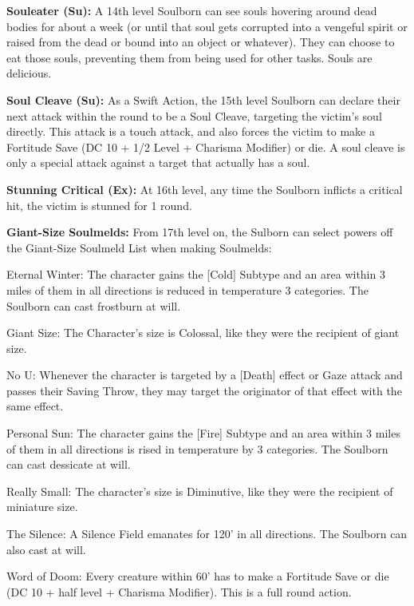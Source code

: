 \textbf{Souleater (Su):} A 14th level Soulborn can see souls hovering around dead bodies for about a week (or until that soul gets corrupted into a vengeful spirit or raised from the dead or bound into an object or whatever). They can choose to eat those souls, preventing them from being used for other tasks. Souls are delicious.

\textbf{Soul Cleave (Su):} As a Swift Action, the 15th level Soulborn can declare their next attack within the round to be a Soul Cleave, targeting the victim's soul directly. This attack is a touch attack, and also forces the victim to make a Fortitude Save (DC 10 + 1/2 Level + Charisma Modifier) or die. A soul cleave is only a special attack against a target that actually has a soul.

\textbf{Stunning Critical (Ex):} At 16th level, any time the Soulborn inflicts a critical hit, the victim is stunned for 1 round.

\textbf{Giant-Size Soulmelds:} From 17th level on, the Sulborn can select powers off the Giant-Size Soulmeld List when making Soulmelds:
\begin{description*}
\item[Eternal Winter:] The character gains the [Cold] Subtype and an area within 3 miles of them in all directions is reduced in temperature 3 categories. The Soulborn can cast frostburn at will.
\item[Giant Size:] The Character's size is Colossal, like they were the recipient of giant size.
\item[No U:] Whenever the character is targeted by a [Death] effect or Gaze attack and passes their Saving Throw, they may target the originator of that effect with the same effect.
\item[Personal Sun:] The character gains the [Fire] Subtype and an area within 3 miles of them in all directions is rised in temperature by 3 categories. The Soulborn can cast dessicate at will.
\item[Really Small:] The character's size is Diminutive, like they were the recipient of miniature size.
\item[The Silence:] A Silence Field emanates for 120' in all directions. The Soulborn can also cast  at will.
\item[Word of Doom:] Every creature within 60' has to make a Fortitude Save or die (DC 10 + half level + Charisma Modifier). This is a full round action.
\end{description*}

